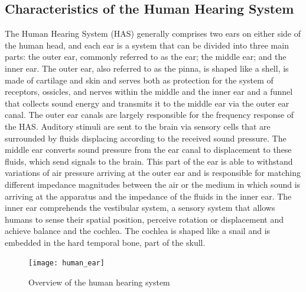 \subsection{Characteristics of the Human Hearing System}
The Human Hearing System (HAS) generally comprises two ears on either side of the human head, and each ear is a system that can be divided into three main parts: the outer ear, commonly referred to as the ear; the middle ear; and the inner ear. The outer ear, also referred to as the pinna, is shaped like a shell, is made of cartilage and skin and serves both as protection for the system of receptors, ossicles, and nerves within the middle and the inner ear and a funnel that collects sound energy and transmits it to the middle ear via the outer ear canal. The outer ear canals are largely responsible for the frequency response of the HAS. 
Auditory stimuli are sent to the brain via sensory cells that are surrounded by fluids displacing according to the received sound pressure. The middle ear converts sound pressure from the ear canal to displacement to these fluids, which send signals to the brain. This part of the ear is able to withstand variations of air pressure arriving at the outer ear and is responsible for matching different impedance magnitudes between the air or the medium in which sound is arriving at the apparatus and the impedance of the fluids in the inner ear.
The inner ear comprehends the vestibular system, a sensory system that allows humans to sense their spatial position, perceive rotation or displacement and achieve balance and the cochlea. The cochlea is shaped like a snail and is embedded in the hard temporal bone, part of the skull.
\begin{figure}
    \centering
    \texttt{[image: human\_ear]}
    \caption[Overview of the human hearing system]{Overview of the human hearing system \citep{zwicker2013psychoacoustics}}
    \label{fig:human_hearing_system}
\end{figure}

\cite{zwicker2013psychoacoustics}


